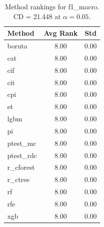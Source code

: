 \begin{table}[h]
\centering
\caption{Method rankings for f1_macro. CD = 21.448 at $\alpha=0.05$.}
\label{tab:ranks_f1_macro}
\begin{tabular}{lcc}
\toprule
Method & Avg Rank & Std \\
\midrule
boruta & 8.00 & 0.00 \\
cat & 8.00 & 0.00 \\
cif & 8.00 & 0.00 \\
cit & 8.00 & 0.00 \\
cpi & 8.00 & 0.00 \\
et & 8.00 & 0.00 \\
lgbm & 8.00 & 0.00 \\
pi & 8.00 & 0.00 \\
ptest_mc & 8.00 & 0.00 \\
ptest_rdc & 8.00 & 0.00 \\
r_cforest & 8.00 & 0.00 \\
r_ctree & 8.00 & 0.00 \\
rf & 8.00 & 0.00 \\
rfe & 8.00 & 0.00 \\
xgb & 8.00 & 0.00 \\
\bottomrule
\end{tabular}
\end{table}